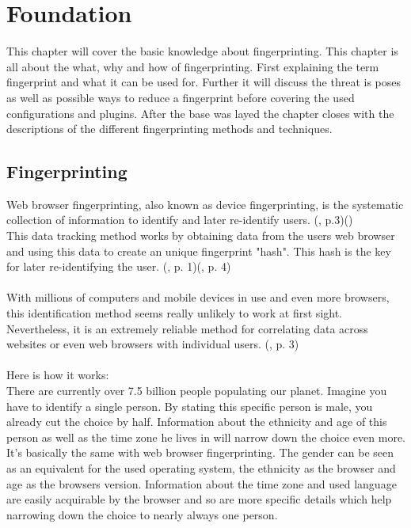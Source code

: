 \chapter{Foundation}
\label{cha:foundation}
This chapter will cover the basic knowledge about fingerprinting. This chapter is all about the what, why and how of fingerprinting.  First explaining the term fingerprint and what it can be used for. Further it will discuss the threat is poses as well as possible ways to reduce a fingerprint before covering the used configurations and plugins. After the base was layed the chapter closes with the descriptions of the different fingerprinting methods and techniques.

\section{Fingerprinting}
Web browser fingerprinting, also known as device fingerprinting, is the systematic collection of information to identify and later re-identify users. (\textcite{doty18}, p.3)(\textcite{amiunique})\\
This data tracking method works by obtaining data from the users web browser and using this data to create an unique fingerprint "hash". This hash is the key for later re-identifying the user. (\textcite{upi15}, p. 1)(\textcite{havens16}, p. 4)\\\\
With millions of computers and mobile devices in use and even more browsers, this identification method seems really unlikely to work at first sight. Nevertheless, it is an extremely reliable method for correlating data across websites or even web browsers with individual users. (\textcite{havens16}, p. 3)\\\\
Here is how it works:\\
There are currently over 7.5 billion people populating our planet. Imagine you have to identify a single person. By stating this specific person is male, you already cut the choice by half. Information about the ethnicity and age of this person as well as the time zone he lives in will narrow down the choice even more.\\
It's basically the same with web browser fingerprinting. The gender can be seen as an equivalent for the used operating system, the ethnicity as the browser and age as the browsers version. Information about the time zone and used language are easily acquirable by the browser and so are more specific details which help narrowing down the choice to nearly always one person.\\\\
